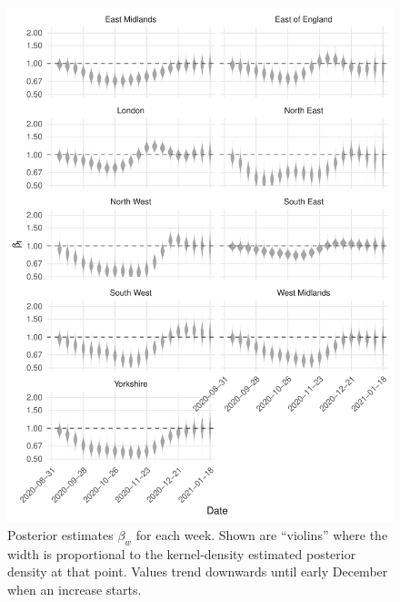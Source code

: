 \documentclass[thesis.tex]{subfiles}
\begin{document}
\begin{figure}
    \includegraphics{SEIR/CIS/beta_walk}
    \caption[Posterior estimates of $\beta_w$]{%
        Posterior estimates $\beta_w$ for each week.
        Shown are ``violins'' where the width is proportional to the kernel-density estimated posterior density at that point.
        Values trend downwards until early December when an increase starts.
    }
    \label{SEIR:fig:beta-walk}
\end{figure}
\end{document}
